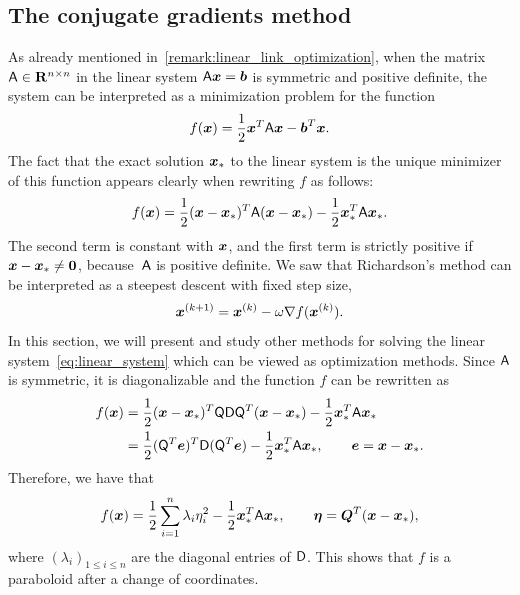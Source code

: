 \subsection{The conjugate gradients method}%
\label{sub:the_conjugate_gradient_method}

As already mentioned in~\cref{remark:linear_link_optimization},
when the matrix $\mathsf A \in \mathbf R^{n \times n}$ in the linear system $\mathsf A \mathbf{\boldsymbol{x}} = \mathbf{\boldsymbol{b}}$ is symmetric and positive definite,
the system can be interpreted as a minimization problem for the function
\begin{equation}
    \label{eq:function_optimization}
    f(\mathbf{\boldsymbol{x}}) = \frac{1}{2} \mathbf{\boldsymbol{x}}^T \mathsf A \mathbf{\boldsymbol{x}} - \mathbf{\boldsymbol{b}}^T \mathbf{\boldsymbol{x}}.
\end{equation}
The fact that
the exact solution $\mathbf{\boldsymbol{x}}_*$ to the linear system is the unique minimizer of this function appears clearly
when rewriting $f$ as follows:
\begin{equation}
    \label{eq:rewritten_expression_of_f}
    f(\mathbf{\boldsymbol{x}})
    = \frac{1}{2} (\mathbf{\boldsymbol{x}} - \mathbf{\boldsymbol{x}}_*)^T \mathsf A (\mathbf{\boldsymbol{x}} - \mathbf{\boldsymbol{x}}_*)  - \frac{1}{2} \mathbf{\boldsymbol{x}}_*^T \mathsf A \mathbf{\boldsymbol{x}}_{*}.
\end{equation}
The second term is constant with $\mathbf{\boldsymbol{x}}$,
and the first term is strictly positive if $\mathbf{\boldsymbol{x}} - \mathbf{\boldsymbol{x}}_* \neq \mathbf{\boldsymbol{0}}$,
because~$\mathsf A$ is positive definite.
We saw that Richardson's method can be interpreted as a steepest descent with fixed step size,
\[
    \mathbf{\boldsymbol{x}}^{(k+1)} = \mathbf{\boldsymbol{x}}^{(k)} - \omega \nabla f(\mathbf{\boldsymbol{x}}^{(k)}).
\]
In this section,
we will present and study other methods
for solving the linear system~\eqref{eq:linear_system}
which can be viewed as optimization methods.
Since $\mathsf A$ is symmetric,
it is diagonalizable and the function $f$ can be rewritten as
\begin{align*}
    f(\mathbf{\boldsymbol{x}})
    &= \frac{1}{2} (\mathbf{\boldsymbol{x}} - \mathbf{\boldsymbol{x}}_*)^T \mathsf Q \mathsf D \mathsf Q^T (\mathbf{\boldsymbol{x}} - \mathbf{\boldsymbol{x}}_*)  - \frac{1}{2} \mathbf{\boldsymbol{x}}_*^T \mathsf A \mathbf{\boldsymbol{x}}_{*} \\
    &= \frac{1}{2} (\mathsf Q^T \mathbf{\boldsymbol{e}})^T \mathsf D (\mathsf Q^T \mathbf{\boldsymbol{e}})  - \frac{1}{2} \mathbf{\boldsymbol{x}}_*^T \mathsf A \mathbf{\boldsymbol{x}}_{*}, \qquad  \mathbf{\boldsymbol{e}} = \mathbf{\boldsymbol{x}} - \mathbf{\boldsymbol{x}}_*.
\end{align*}
Therefore, we have that
\begin{align*}
    f(\mathbf{\boldsymbol{x}})= \frac{1}{2} \sum_{i=1}^{n} \lambda_i \eta_i^2 - \frac{1}{2} \mathbf{\boldsymbol{x}}_*^T \mathsf A \mathbf{\boldsymbol{x}}_{*}, \qquad  \mathbf{\boldsymbol{\eta}} = \mathbf{\boldsymbol{Q}}^T (\mathbf{\boldsymbol{x}} - \mathbf{\boldsymbol{x}}_*),
\end{align*}
where $(\lambda_i)_{1 \leq i \leq n}$ are the diagonal entries of $\mathsf D$.
This shows that $f$ is a paraboloid
after a change of coordinates.

